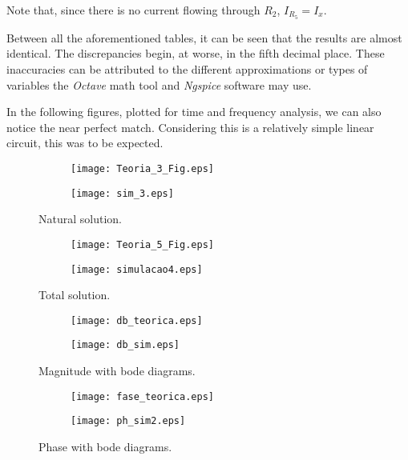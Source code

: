Note that, since there is no current flowing through $R_2$, $I_{R_5} = I_x$.

Between all the aforementioned tables, it can be seen that the results are almost identical. The discrepancies begin, at worse, in the fifth decimal place. These inaccuracies can be attributed to the different approximations or types of variables the \textit{Octave} math tool and \textit{Ngspice} software may use.

In the following figures, plotted for time and frequency analysis, we can also notice the near perfect match. Considering this is a relatively simple linear circuit, this was to be expected.

\begin{figure}[ht]
    \centering
    \begin{subfigure}{.45\textwidth}
        \centering
        \texttt{[image: Teoria\_3\_Fig.eps]}
    \end{subfigure}
    \begin{subfigure}{.45\textwidth}
        \centering
        \texttt{[image: sim\_3.eps]}
    \end{subfigure}
    \caption{Natural solution.}
\end{figure}

\begin{figure}[ht]
    \centering
    \begin{subfigure}{.45\textwidth}
        \centering
        \texttt{[image: Teoria\_5\_Fig.eps]}
    \end{subfigure}
    \begin{subfigure}{.45\textwidth}
        \centering
        \texttt{[image: simulacao4.eps]}
    \end{subfigure}
    \caption{Total solution.}
\end{figure}


\begin{figure}[ht]
    \centering
    \begin{subfigure}{.45\textwidth}
        \centering
        \texttt{[image: db\_teorica.eps]}
    \end{subfigure}
    \begin{subfigure}{.45\textwidth}
        \centering
        \texttt{[image: db\_sim.eps]}
    \end{subfigure}
    \caption{Magnitude with bode diagrams.}
\end{figure}


\begin{figure}[ht]
    \centering
    \begin{subfigure}{.45\textwidth}
        \centering
        \texttt{[image: fase\_teorica.eps]}
    \end{subfigure}
    \begin{subfigure}{.45\textwidth}
        \centering
        \texttt{[image: ph\_sim2.eps]}
    \end{subfigure}
    \caption{Phase with bode diagrams.}
\end{figure}

\newpage